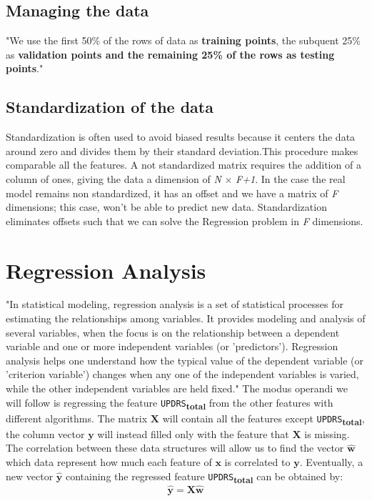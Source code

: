 \documentclass[12pt]{report}
\begin{document}
\subsection{Managing the data}
"We use the first 50\% of the rows of data as \textbf{training points}, the subquent 25\% as \textbf{validation points and the remaining 25\% of the rows as \textbf{testing points}}."\cite{MV1}
\subsection{Standardization of the data}
Standardization is often used to avoid biased results because it centers the data around zero and divides them by their standard deviation.This procedure makes comparable all the features. A not standardized matrix requires the addition of a column of ones, giving the data a dimension of \textit{N} $\times$ \textit{F+1}. In the case the real model remains non standardized, it has an offset and we have a matrix of \textit{F} dimensions; this case, won't be able to predict new data. Standardization eliminates offsets such that we can solve the Regression problem in \textit{F} dimensions.
\section{Regression Analysis}
"In statistical modeling, regression analysis is a set of statistical processes for estimating the relationships among variables. It provides modeling and analysis of several variables, when the focus is on the relationship between a dependent variable and one or more independent variables (or 'predictors'). Regression analysis helps one understand how the typical value of the dependent variable (or 'criterion variable') changes when any one of the independent variables is varied, while the other independent variables are held fixed."\cite{WikiRegression} The modus operandi we will follow is regressing the feature \texttt{UPDRS}\textsubscript{\textbf{total}} from the other features with different algorithms. The matrix $\textbf{X}$ will contain all the features except \texttt{UPDRS}\textsubscript{\textbf{total}}, the column vector $\textbf{y}$ will instead filled only with the feature that $\textbf{X}$ is missing. The correlation between these data structures will allow us to find the vector $\hat { \mathbf { w } }$ which data represent how much each feature of $\textbf{x}$ is correlated to $\textbf{y}$.
Eventually, a new vector $\hat { \mathbf { y } }$ containing the regressed feature \texttt{UPDRS}\textsubscript{\textbf{total}} can be obtained by:
\begin{equation}
\hat { \mathbf { y } } = \mathbf { X } \hat { \mathbf { w } }
\end{equation}
\end{document}
